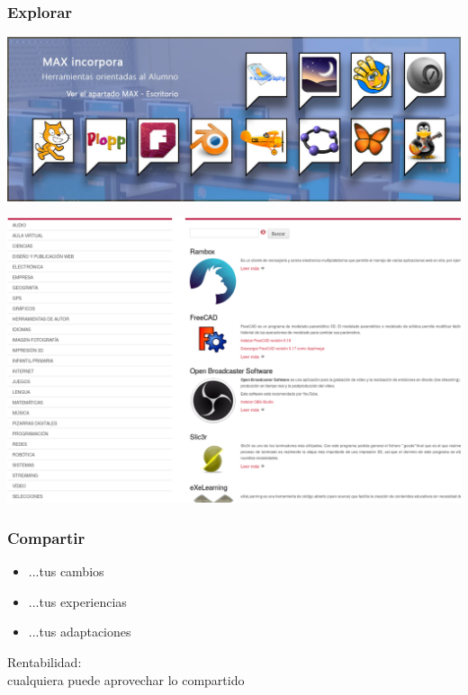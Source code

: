 \documentclass[17pt,aspectratio=169]{beamer}
\begin{document}

\begin{frame}
\frametitle{Explorar}

\includegraphics[width=\linewidth]{figs/max-2}

\end{frame}


\begin{frame}

\includegraphics[width=\linewidth]{figs/max-3}

\end{frame}


\begin{frame}
\frametitle{Compartir}

\begin{itemize}
\item ...tus cambios
\item ...tus experiencias
\item ...tus adaptaciones
\end{itemize}

\begin{flushright}
  Rentabilidad: \\
  cualquiera puede aprovechar lo compartido \\
\end{flushright}
\end{frame}
\end{document}

